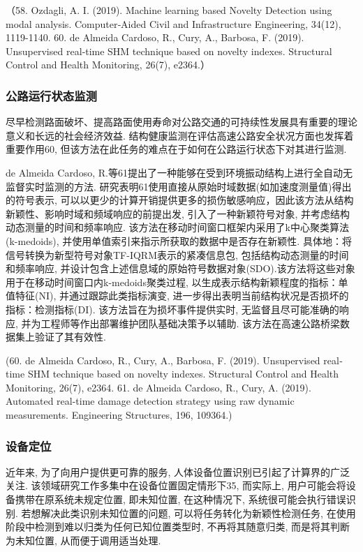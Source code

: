 \documentclass{Style/aas}
\begin{document}
\begin{multicols}{2}
  （58.	Ozdagli, A. I. (2019). Machine learning based Novelty Detection using modal analysis. Computer‐Aided Civil and Infrastructure Engineering, 34(12), 1119-1140.
  60.	de Almeida Cardoso, R., Cury, A., Barbosa, F. (2019). Unsupervised real‐time SHM technique based on novelty indexes. Structural Control and Health Monitoring, 26(7), e2364.）

  \subsubsection{公路运行状态监测}
  尽早检测路面破坏、提高路面使用寿命对公路交通的可持续性发展具有重要的理论意义和长远的社会经济效益. 结构健康监测在评估高速公路安全状况方面也发挥着重要作用60, 但该方法在此任务的难点在于如何在公路运行状态下对其进行监测.

  de Almeida Cardoso, R.等61提出了一种能够在受到环境振动结构上进行全自动无监督实时监测的方法. 研究表明61使用直接从原始时域数据(如加速度测量值)得出的符号表示, 可以以更少的计算开销提供更多的损伤敏感响应，因此该方法从结构新颖性、影响时域和频域响应的前提出发, 引入了一种新颖符号对象, 并考虑结构动态测量的时间和频率响应. 该方法在移动时间窗口框架内采用了k中心聚类算法(k-medoids), 并使用单值索引来指示所获取的数据中是否存在新颖性. 具体地：将信号转换为新型符号对象TF-IQRM表示的紧凑信息包, 包括结构动态测量的时间和频率响应, 并设计包含上述信息域的原始符号数据对象(SDO).该方法将这些对象用于在移动时间窗口内k-medoids聚类过程, 以生成表示结构新颖程度的指标：单值特征(NI), 并通过跟踪此类指标演变, 进一步得出表明当前结构状况是否损坏的指标：检测指标(DI). 该方法旨在为损坏事件提供实时, 无监督且尽可能准确的响应, 并为工程师等作出部署维护团队基础决策予以辅助. 该方法在高速公路桥梁数据集上验证了其有效性.

  (60.	de Almeida Cardoso, R., Cury, A., Barbosa, F. (2019). Unsupervised real‐time SHM technique based on novelty indexes. Structural Control and Health Monitoring, 26(7), e2364.
  61.	de Almeida Cardoso, R., Cury, A. (2019). Automated real-time damage detection strategy using raw dynamic measurements. Engineering Structures, 196, 109364.)

  \subsubsection{设备定位}
  近年来, 为了向用户提供更可靠的服务, 人体设备位置识别已引起了计算界的广泛关注. 该领域研究工作多集中在设备位置固定情形下35, 而实际上, 用户可能会将设备携带在原系统未规定位置, 即未知位置, 在这种情况下, 系统很可能会执行错误识别. 若想解决此类识别未知位置的问题, 可以将任务转化为新颖性检测任务, 在使用阶段中检测到难以归类为任何已知位置类型时, 不再将其随意归类, 而是将其判断为未知位置, 从而便于调用适当处理.


\end{multicols}
\end{document}
